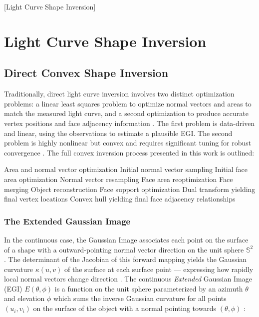 [Light Curve Shape Inversion]
\graphicspath{{/Users/liamrobinson/Documents/msthesis/static_images/aas_2022_figs}}
\chapter{Light Curve Shape Inversion}

\section{Direct Convex Shape Inversion}

Traditionally, direct light curve inversion involves two distinct optimization problems: a linear least squares problem to optimize normal vectors and areas to match the measured light curve, and a second optimization to produce accurate vertex positions and face adjacency information \cite{fan2020thesis, kaasalainen2000, kaas2001shape, cabrera2021}. The first problem is data-driven and linear, using the observations to estimate a plausible EGI. The second problem is highly nonlinear but convex and requires significant tuning for robust convergence \cite{fan2019}. The full convex inversion process presented in this work is outlined:

\begin{outline}[enumerate]
  \1 Area and normal vector optimization
    \2 Initial normal vector sampling
    \2 Initial face area optimization
    \2 Normal vector resampling
    \2 Face area reoptimization
    \2 Face merging
  \1 Object reconstruction
    \2 Face support optimization
    \2 Dual transform yielding final vertex locations
    \2 Convex hull yielding final face adjacency relationships
\end{outline}

\subsection{The Extended Gaussian Image} \label{sec:egi_definition}

In the continuous case, the Gaussian Image associates each point on the surface of a shape with a outward-pointing normal vector direction on the unit sphere $\mathbb{S}^2$ \cite{horn1984}. The determinant of the Jacobian of this forward mapping yields the Gaussian curvature $\kappa(u,v)$ of the surface at each surface point --- expressing how rapidly local normal vectors change direction \cite{horn1984}. The continuous \textit{Extended} Gaussian Image (EGI) $E(\theta, \phi)$ is a function on the unit sphere parameterized by an azimuth $\theta$ and elevation $\phi$ which sums the inverse Gaussian curvature for all points $(u_i, v_i)$ on the surface of the object with a normal pointing towards $(\theta, \phi)$ \cite{horn1984}:

